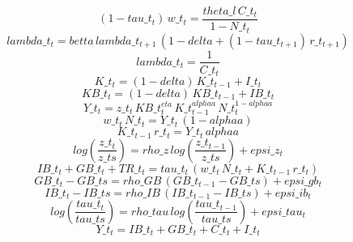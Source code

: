 \documentclass[10pt,a4paper]{article}
\begin{document}
\footnotesize
\begin{dmath}
\left(1-tau\_t_{t}\right)\, w\_t_{t}=\frac{theta\_l\, C\_t_{t}}{1-N\_t_{t}}
\end{dmath}
\begin{dmath}
lambda\_t_{t}=betta\, lambda\_t_{t+1}\, \left(1-delta+\left(1-tau\_t_{t+1}\right)\, r\_t_{t+1}\right)
\end{dmath}
\begin{dmath}
lambda\_t_{t}=\frac{1}{C\_t_{t}}
\end{dmath}
\begin{dmath}
K\_t_{t}=\left(1-delta\right)\, K\_t_{t-1}+I\_t_{t}
\end{dmath}
\begin{dmath}
KB\_t_{t}=\left(1-delta\right)\, KB\_t_{t-1}+IB\_t_{t}
\end{dmath}
\begin{dmath}
Y\_t_{t}=z\_t_{t}\, KB\_t_{t}^{eta}\, K\_t_{t-1}^{alphaa}\, N\_t_{t}^{1-alphaa}
\end{dmath}
\begin{dmath}
w\_t_{t}\, N\_t_{t}=Y\_t_{t}\, \left(1-alphaa\right)
\end{dmath}
\begin{dmath}
K\_t_{t-1}\, r\_t_{t}=Y\_t_{t}\, alphaa
\end{dmath}
\begin{dmath}
log\left(\frac{z\_t_{t}}{z\_ts}\right)=rho\_z\, log\left(\frac{z\_t_{t-1}}{z\_ts}\right)+epsi\_z_{t}
\end{dmath}
\begin{dmath}
IB\_t_{t}+GB\_t_{t}+TR\_t_{t}=tau\_t_{t}\, \left(w\_t_{t}\, N\_t_{t}+K\_t_{t-1}\, r\_t_{t}\right)
\end{dmath}
\begin{dmath}
GB\_t_{t}-GB\_ts=rho\_GB\, \left(GB\_t_{t-1}-GB\_ts\right)+epsi\_gb_{t}
\end{dmath}
\begin{dmath}
IB\_t_{t}-IB\_ts=rho\_IB\, \left(IB\_t_{t-1}-IB\_ts\right)+epsi\_ib_{t}
\end{dmath}
\begin{dmath}
log\left(\frac{tau\_t_{t}}{tau\_ts}\right)=rho\_tau\, log\left(\frac{tau\_t_{t-1}}{tau\_ts}\right)+epsi\_tau_{t}
\end{dmath}
\begin{dmath}
Y\_t_{t}=IB\_t_{t}+GB\_t_{t}+C\_t_{t}+I\_t_{t}
\end{dmath}
\end{document}
